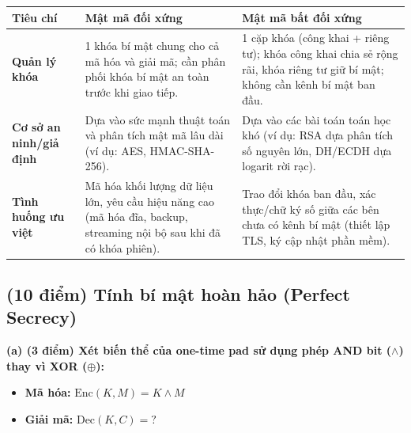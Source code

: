 \begin{tabular}{|l|p{5cm}|p{5cm}|}
\hline
\textbf{Tiêu chí} & \textbf{Mật mã đối xứng} & \textbf{Mật mã bất đối xứng} \\
\hline
\textbf{Quản lý khóa} & 
1 khóa bí mật chung cho cả mã hóa và giải mã; cần phân phối khóa bí mật an toàn trước khi giao tiếp. & 
1 cặp khóa (công khai + riêng tư); khóa công khai chia sẻ rộng rãi, khóa riêng tư giữ bí mật; không cần kênh bí mật ban đầu. \\
\hline
\textbf{Cơ sở an ninh/giả định} & 
Dựa vào sức mạnh thuật toán và phân tích mật mã lâu dài (ví dụ: AES, HMAC-SHA-256). & 
Dựa vào các bài toán toán học khó (ví dụ: RSA dựa phân tích số nguyên lớn, DH/ECDH dựa logarit rời rạc). \\
\hline
\textbf{Tình huống ưu việt} & 
Mã hóa khối lượng dữ liệu lớn, yêu cầu hiệu năng cao (mã hóa đĩa, backup, streaming nội bộ sau khi đã có khóa phiên). & 
Trao đổi khóa ban đầu, xác thực/chữ ký số giữa các bên chưa có kênh bí mật (thiết lập TLS, ký cập nhật phần mềm). \\
\hline
\end{tabular}

\subsection{(10 điểm) Tính bí mật hoàn hảo (Perfect Secrecy)}

\textbf{(a) (3 điểm) Xét biến thể của one-time pad sử dụng phép AND bit ($\land$) thay vì XOR ($\oplus$):}

\begin{itemize}
    \item \textbf{Mã hóa:} $\text{Enc}(K, M) = K \land M$
    \item \textbf{Giải mã:} $\text{Dec}(K, C) = ?$
\end{itemize}

